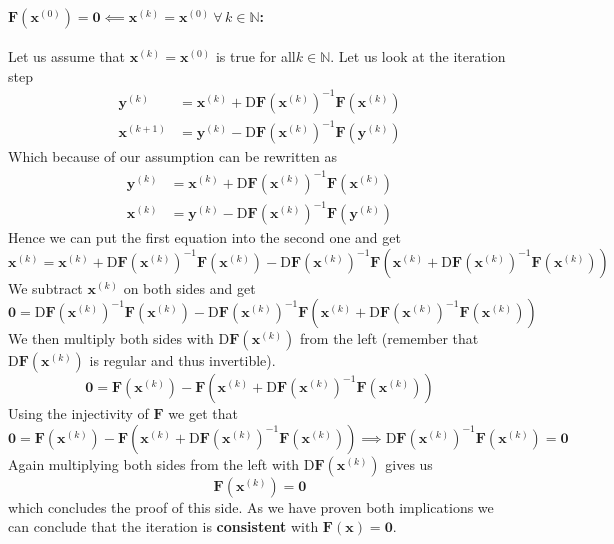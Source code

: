 \documentclass{article}
\newcommand\xk{\mathbf{x}^{\left(k\right)}}
\newcommand\xkn{\mathbf{x}^{\left(k+1\right)}}
\newcommand\yk{\mathbf{y}^{\left(k\right)}}
\begin{document}
\paragraph{$\mathbf{F}\left(\mathbf{x}^{\left(0\right)}\right) = \mathbf{0} \impliedby\xk = \mathbf{x}^{\left(0\right)} \: \forall\, k \in \mathbb{N}$:} Let us assume that  $\xk = \mathbf{x}^{\left(0\right)}$ is true for all$k \in \mathbb{N}$. Let us look at the iteration step
\begin{align*}
    \yk &= \xk + \mathrm{D}\mathbf{F}\left(\xk\right)^{-1} \mathbf{F}\left(\xk\right) \\
    \xkn &= \yk - \mathrm{D}\mathbf{F}\left(\xk\right)^{-1} \mathbf{F}\left(\yk\right)
\end{align*}
Which because of our assumption can be rewritten as
\begin{align*}
    \yk &= \xk + \mathrm{D}\mathbf{F}\left(\xk\right)^{-1} \mathbf{F}\left(\xk\right) \\
    \xk &= \yk - \mathrm{D}\mathbf{F}\left(\xk\right)^{-1} \mathbf{F}\left(\yk\right)
\end{align*}
Hence we can put the first equation into the second one and get
\begin{equation*}
    \xk = \xk + \mathrm{D}\mathbf{F}\left(\xk\right)^{-1} \mathbf{F}\left(\xk\right) - \mathrm{D}\mathbf{F}\left(\xk\right)^{-1} \mathbf{F}\left(\xk + \mathrm{D}\mathbf{F}\left(\xk\right)^{-1} \mathbf{F}\left(\xk\right)\right)
\end{equation*}
We subtract $\xk$ on both sides and get
\begin{equation*}
    \mathbf{0} = \mathrm{D}\mathbf{F}\left(\xk\right)^{-1} \mathbf{F}\left(\xk\right) - \mathrm{D}\mathbf{F}\left(\xk\right)^{-1} \mathbf{F}\left(\xk + \mathrm{D}\mathbf{F}\left(\xk\right)^{-1} \mathbf{F}\left(\xk\right)\right)
\end{equation*}
We then multiply both sides with $\mathrm{D}\mathbf{F}\left(\xk\right)$ from the left (remember that $\mathrm{D}\mathbf{F}\left(\xk\right)$ is regular and thus invertible).
\begin{equation*}
    \mathbf{0} = \mathbf{F}\left(\xk\right) - \mathbf{F}\left(\xk + \mathrm{D}\mathbf{F}\left(\xk\right)^{-1} \mathbf{F}\left(\xk\right)\right)
\end{equation*}
Using the injectivity of $\mathbf{F}$ we get that
\begin{equation*}
    \mathbf{0} = \mathbf{F}\left(\xk\right) - \mathbf{F}\left(\xk + \mathrm{D}\mathbf{F}\left(\xk\right)^{-1} \mathbf{F}\left(\xk\right)\right) \implies \mathrm{D}\mathbf{F}\left(\xk\right)^{-1} \mathbf{F}\left(\xk\right) = \mathbf{0}
\end{equation*}
Again multiplying both sides from the left with $\mathrm{D}\mathbf{F}\left(\xk\right)$ gives us 
\begin{equation*}
     \mathbf{F}\left(\xk\right) = \mathbf{0}
\end{equation*}
which concludes the proof of this side. As we have proven both implications we can conclude that the iteration is \textbf{consistent} with $\mathbf{F}\left(\mathbf{x}\right) = \mathbf{0}$.
\end{document}
